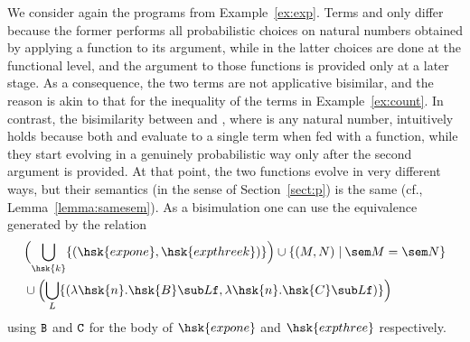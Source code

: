 \begin{example}
  We consider again the programs from Example~\ref{ex:exp}.  Terms
   and  only differ because the former
  performs all probabilistic choices on {natural numbers} obtained by
  applying a function to its argument, while in the latter choices are
  done at the functional level, and the argument to those functions is
  provided only at a later stage.  As a consequence, the two terms are
  not applicative bisimilar, and the reason is akin to that for
  the   inequality of the terms in 
  Example~\ref{ex:count}. 
  In contrast, the bisimilarity between   and , where  is any natural number, intuitively holds because
  both 
   and  evaluate to a single term when fed with a
  function, while they start evolving in a genuinely probabilistic way
  only after the second argument is provided. At
  that point, the two functions evolve in very different ways, but
  their semantics (in the sense of Section~\ref{sect:p}) is 
  the same (cf.,  Lemma~\ref{lemma:samesem}).
  As a bisimulation one can use the equivalence generated by the relation
  \begin{align*}
    &\Bigl(\bigcup_{\hsk{k}}\{( \hsk{expone}, \hsk{expthree k})\}\Bigr) \cup
    \{(M,N)\; | \:  {\sem M} = {\sem N }\}\\
    &\cup \Bigl(\bigcup_L \{ (\lambda \hsk{n}. \hsk{B} \sub L {\tt{f}},
    \lambda \hsk{n}. \hsk{C} \sub L {\tt{f}} )\} \Bigr)
  \end{align*}
  using $\tt{B}$ and $\tt{C}$ for the body of $\hsk{expone}$ and
  $\hsk{expthree}$ respectively.
\end{example}
